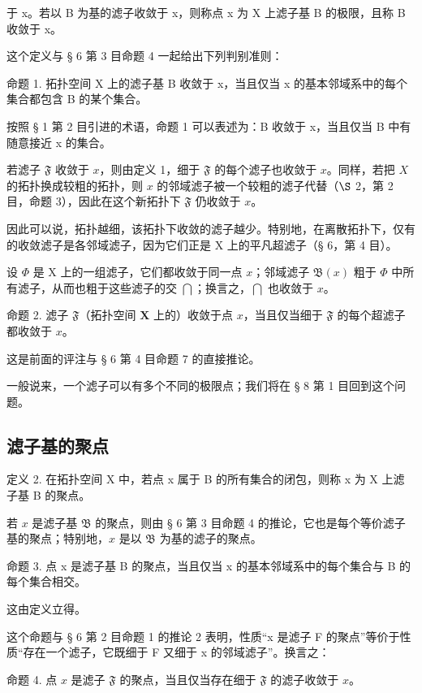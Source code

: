 于 x。若以 B 为基的滤子收敛于 x，则称点 x 为 X 上滤子基 B 的极限，且称 B 收敛于 x。

这个定义与 § 6 第 3 目命题 4 一起给出下列判别准则：

命题 1. 拓扑空间 X 上的滤子基 B 收敛于 x，当且仅当 x 的基本邻域系中的每个集合都包含 B 的某个集合。

按照 § 1 第 2 目引进的术语，命题 1 可以表述为：B 收敛于 x，当且仅当 B 中有随意接近 x 的集合。

若滤子 \(\mathfrak{F}\) 收敛于 \(x\)，则由定义 1，细于 \(\mathfrak{F}\) 的每个滤子也收敛于 \(x\)。同样，若把 \(X\) 的拓扑换成较粗的拓扑，则 \(x\) 的邻域滤子被一个较粗的滤子代替（\(\S\) 2，第 2 目，命题 3），因此在这个新拓扑下 \(\mathfrak{F}\) 仍收敛于 \(x\)。

因此可以说，拓扑越细，该拓扑下收敛的滤子越少。特别地，在离散拓扑下，仅有的收敛滤子是各邻域滤子，因为它们正是 X 上的平凡超滤子（§ 6，第 4 目）。

设 \(\Phi\) 是 X 上的一组滤子，它们都收敛于同一点 \(x\)；邻域滤子 \(\mathfrak{B}(x)\) 粗于 \(\Phi\) 中所有滤子，从而也粗于这些滤子的交 \(\bigcap\)；换言之，\(\bigcap\) 也收敛于 \(x\)。

命题 2. 滤子 \(\mathfrak{F}\)（拓扑空间 \(\mathbf{X}\) 上的）收敛于点 \(x\)，当且仅当细于 \(\mathfrak{F}\) 的每个超滤子都收敛于 \(x\)。

这是前面的评注与 § 6 第 4 目命题 7 的直接推论。

一般说来，一个滤子可以有多个不同的极限点；我们将在 § 8 第 1 目回到这个问题。

\subsection{滤子基的聚点}

定义 2. 在拓扑空间 X 中，若点 x 属于 B 的所有集合的闭包，则称 x 为 X 上滤子基 B 的聚点。

若 \(x\) 是滤子基 \(\mathfrak{B}\) 的聚点，则由 § 6 第 3 目命题 4 的推论，它也是每个等价滤子基的聚点；特别地，\(x\) 是以 \(\mathfrak{B}\) 为基的滤子的聚点。

命题 3. 点 x 是滤子基 B 的聚点，当且仅当 x 的基本邻域系中的每个集合与 B 的每个集合相交。

这由定义立得。

这个命题与 § 6 第 2 目命题 1 的推论 2 表明，性质“x 是滤子 F 的聚点”等价于性质“存在一个滤子，它既细于 F 又细于 x 的邻域滤子”。换言之：

命题 4. 点 \(x\) 是滤子 \(\mathfrak{F}\) 的聚点，当且仅当存在细于 \(\mathfrak{F}\) 的滤子收敛于 \(x\)。

